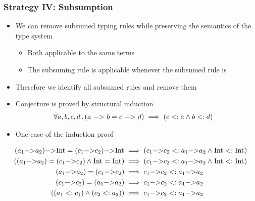 \documentclass{beamer}
\newcommand{\code}{\lstinline[breaklines=true]}
\begin{document}
\begin{frame}[fragile]
  \frametitle{Strategy IV: Subsumption}
  \begin{itemize}
  \item We can remove subsumed typing rules while preserving the
    semantics of the type system
    \begin{itemize}
    \item Both applicable to the same terms
    \item The subsuming rule is applicable whenever the subsumed rule is
    \end{itemize}
  \item Therefore we identify all subsumed rules and remove them
  \item Conjecture is proved by structural induction
    \begin{align*}
        \forall a, b, c, d \,.\, (a \text{ \code|->| } b = c \text{
          \code|->| } d) &\implies (
        c <: a \land b <: d)
    \end{align*}
  \item One case of the induction proof
\end{itemize}
\small
\begin{align*}
  (a_1 \text{\code|->|} a_2) \text{\code|->|} \text{\code|Int|} = (c_1
  \text{\code|->|} c_2) \text{\code|->|} \text{\code|Int|} &\implies (
  c_1 \text{\code|->|} c_2 <: a_1 \text{\code|->|} a_2\land
  \text{\code|Int|} <: \text{\code|Int|}) \\
  ((a_1 \text{\code|->|} a_2) = (c_1 \text{\code|->|} c_2) \land
  \text{\code|Int|} = \text{\code|Int|}) &\implies (c_1
  \text{\code|->|} c_2 <: a_1 \text{\code|->|} a_2 \land
  \text{\code|Int|} <:
  \text{\code|Int|}) \\
  (a_1 \text{\code|->|} a_2) = (c_1 \text{\code|->|} c_2) &\implies
  c_1 \text{\code|->|} c_2 <: a_1 \text{\code|->|}
  a_2 \\
  (c_1 \text{\code|->|} c_2) = (a_1 \text{\code|->|} a_2) &\implies
  c_1 \text{\code|->|} c_2 <: a_1 \text{\code|->|}
  a_2 \\
  ((a_1 <: c_1) \land (c_2 <: a_2)) &\implies c_1 \text{\code|->|} c_2
  <: a_1 \text{\code|->|} a_2
\end{align*}
\end{frame}
\end{document}
